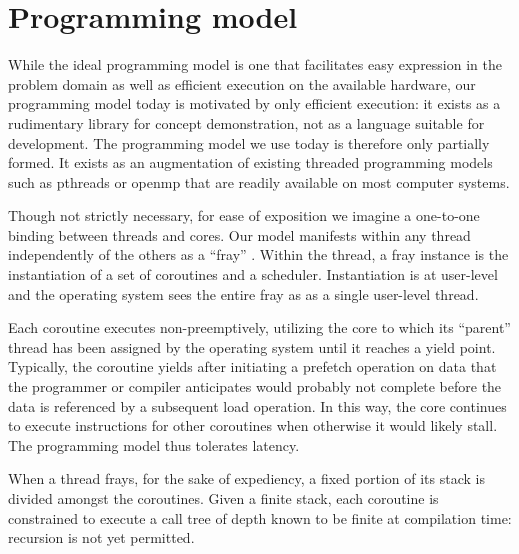 \documentclass{acm_proc_article-sp}
\begin{document}


\section{Programming model}

While the ideal programming model is one that facilitates easy
expression in the problem domain as well as efficient execution on the
available hardware, our programming model today is motivated by only
efficient execution: it exists as a rudimentary library for concept
demonstration, not as a language suitable for development.  The
programming model we use today is therefore only partially formed. It
exists as an augmentation of existing threaded programming models such
as pthreads or openmp that are readily available on most computer
systems.

Though not strictly necessary, for ease of exposition we imagine a
one-to-one binding between threads and cores.  Our model manifests
within any thread independently of the others as a ``fray'' .  Within the thread, a fray instance is the
instantiation of a set of coroutines and a scheduler.  Instantiation
is at user-level and the operating system sees the entire fray as as a
single user-level thread.


Each coroutine executes non-preemptively, utilizing the core to which
its ``parent'' thread has been assigned by the operating system until it
reaches a yield point.  Typically, the coroutine yields after
initiating a prefetch operation on data that the programmer or
compiler anticipates would probably not complete before the data is
referenced by a subsequent load operation.  In this way, the core
continues to execute instructions for other coroutines when otherwise
it would likely stall.  The programming model thus tolerates latency.


When a thread frays, for the sake of expediency, a fixed portion of
its stack is divided amongst the coroutines.  Given a finite stack,
each coroutine is constrained to execute a call tree of depth known to
be finite at compilation time: recursion is not yet permitted.
\end{document}
